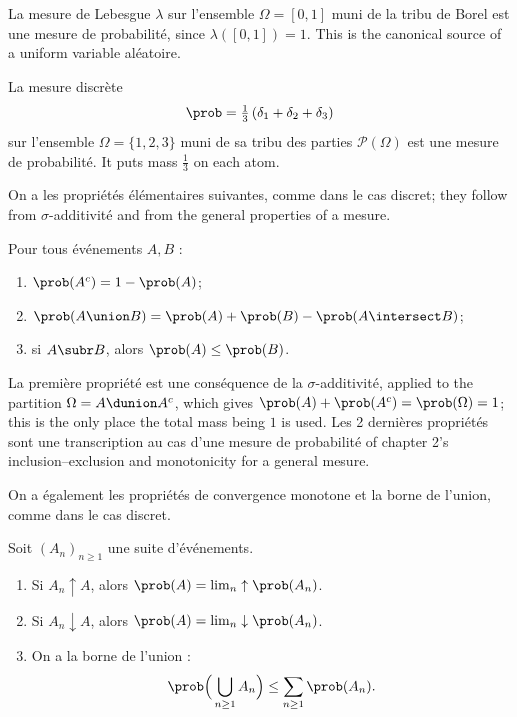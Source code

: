 \begin{example}
  La mesure de Lebesgue $\lambda$ sur l'ensemble $\Omega = [0,1]$ muni de la
  tribu de Borel est une mesure de probabilité, since $\lambda([0,1])=1$. This is
  the canonical source of a uniform variable aléatoire.
\end{example}

\begin{example}
  La mesure discrète
  \[
    \prob = \tfrac{1}{3}\left(\delta_{1}+\delta_{2}+\delta_{3}\right)
  \]
  sur l'ensemble $\Omega = \{1,2,3\}$ muni de sa tribu des parties
  $\mathcal{P}(\Omega)$ est une mesure de probabilité. It puts mass $\tfrac13$ on
  each atom.
\end{example}

On a les propriétés élémentaires suivantes, comme dans le cas discret; they
follow from $\sigma$-additivité and from the general properties of a mesure.

\begin{prop}
  Pour tous événements $A,B$ :
  \begin{enumerate}
    \item $\prob(A^{c}) = 1 - \prob(A)$;
    \item $\prob(A \union B) = \prob(A) + \prob(B) - \prob(A \intersect B)$;
    \item si $A \subr B$, alors $\prob(A) \leq \prob(B)$.
  \end{enumerate}
\end{prop}

\begin{remark}
  La première propriété est une conséquence de la $\sigma$-additivité, applied to
  the partition $\Omega = A \dunion A^{c}$, which gives
  $\prob(A)+\prob(A^{c}) = \prob(\Omega) = 1$; this is the only place the total
  mass being $1$ is used. Les 2 dernières propriétés sont une transcription au cas
  d'une mesure de probabilité of chapter 2's inclusion--exclusion and monotonicity
  for a general mesure.
\end{remark}

On a également les propriétés de convergence monotone et la borne de l'union,
comme dans le cas discret.

\begin{prop}
  Soit $(A_{n})_{n \geq 1}$ une suite d'événements.
  \begin{enumerate}
    \item Si $A_{n} \uparrow A$, alors $\prob(A) = \lim_{n} \uparrow \prob(A_{n})$.
    \item Si $A_{n} \downarrow A$, alors $\prob(A) = \lim_{n} \downarrow \prob(A_{n})$.
    \item On a la borne de l'union :
      \[
        \prob\Big(\bigcup_{n \geq 1} A_{n}\Big) \leq \sum_{n \geq 1} \prob(A_{n}).
      \]
  \end{enumerate}
\end{prop}

